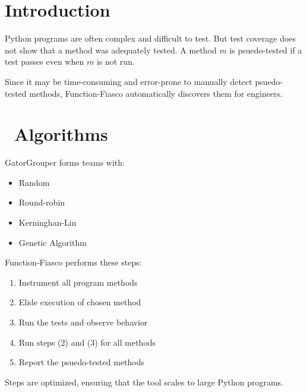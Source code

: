 \documentclass[a0paper,fleqn]{betterposter}
\begin{document}
{  \vspace*{-.5in}

  \section{Introduction}
  Python programs are often complex and difficult to test.
  But test coverage does not show that a method was adequately tested.
  A method $m$ is psuedo-tested if a test passes even when $m$ is not run.

  \vspace*{.25in}

  Since it may be time-consuming and error-prone to manually detect
  psuedo-tested methods, Function-Fiasco automatically discovers them for
  engineers.

  \vspace*{-.25in}
  \section{\faCog~Algorithms}
  GatorGrouper forms teams with:

  \begin{itemize}

    \item Random
    \item Round-robin
    \item Kerninghan-Lin
    \item Genetic Algorithm

  \end{itemize}

  \vspace*{.5in}
  Function-Fiasco performs these steps:

  \begin{enumerate}[leftmargin=.5in]

    \item Instrument all program methods
    \item Elide execution of chosen method
    \item Run the tests and observe behavior
    \item Run steps (2) and (3) for all methods
    \item Report the psuedo-tested methods

  \end{enumerate}

  \vspace*{.25in}
  Steps are optimized, ensuring that the tool scales to large Python programs.
  \vspace*{.5in}

}
\end{document}
